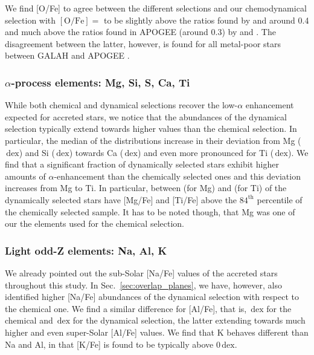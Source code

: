 \documentclass[fleqn,usenatbib]{mnras}
\newcommand{\dex}{\,\mathrm{dex}}	%
\begin{document}
We find [O/Fe] to agree between the different selections and our chemodynamical selection with $\mathrm{[O/Fe]} =$  to be slightly above the ratios found by \citet{Ramirez2012b} and \citet{Nissen2014} around 0.4 and much above the ratios found in APOGEE (around 0.3) by \citet{Hawkins2015} and \citet{Hayes2018}. The disagreement between the latter, however, is found for all metal-poor stars between GALAH and APOGEE \citep[e.g.][]{Buder2018}.

\subsubsection{$\alpha$-process elements: Mg, Si, S, Ca, Ti} \label{sec:chronochemodynamics_alpha}

While both chemical and dynamical selections recover the low-$\alpha$ enhancement expected for accreted stars, we notice that the abundances of the dynamical selection typically extend towards higher values than the chemical selection. In particular, the median of the distributions increase in their deviation from Mg ($\dex$) and Si ($\dex$) towards Ca ($\dex$) and even more pronounced for Ti ($\dex$). We find that a significant fraction of dynamically selected stars exhibit higher amounts of $\alpha$-enhancement than the chemically selected ones and this deviation increases from Mg to Ti. In particular, between  (for Mg) and  (for Ti) of the dynamically selected stars have [Mg/Fe] and [Ti/Fe] above the $84^\text{th}$ percentile of the chemically selected sample. It has to be noted though, that Mg was one of our the elements used for the chemical selection.

\subsubsection{Light odd-Z elements: Na, Al, K} \label{sec:chronochemodynamics_oddz}

We already pointed out the sub-Solar [Na/Fe] values of the accreted stars throughout this study. In Sec.~\ref{sec:overlap_planes}, we have, however, also identified higher [Na/Fe] abundances of the dynamical selection with respect to the chemical one. We find a similar difference for [Al/Fe], that is, $\dex$ for the chemical and $\dex$ for the dynamical selection, the latter extending towards much higher and even super-Solar [Al/Fe] values. We find that K behaves different than Na and Al, in that [K/Fe] is found to be typically above $0\dex$.
\end{document}
